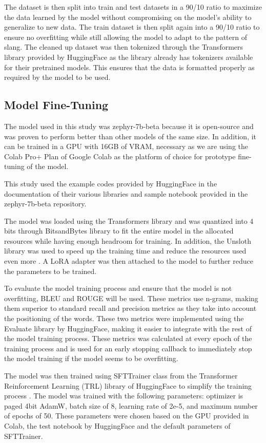 The dataset is then split into train and test datasets in a 90/10 ratio to maximize the data learned by the model without compromising on the model's ability to generalize to new data. The train dataset is then split again into a 90/10 ratio to ensure no overfitting while still allowing the model to adapt to the pattern of slang. The cleaned up dataset was then tokenized through the Transformers library provided by HuggingFace as the library already has tokenizers available for their pretrained models.
This ensures that the data is formatted properly as required by the model to be used.

\subsection{Model Fine-Tuning}
The model used in this study was zephyr-7b-beta because it is open-source and was proven to perform better than other models of the same size. In addition, it can be trained in a GPU with 16GB of VRAM, necessary as we are using the Colab Pro+ Plan of Google Colab as the platform of choice for prototype fine-tuning of the model.

This study used the example codes provided by HuggingFace in the documentation of their various libraries and sample notebook provided in the zephyr-7b-beta repository. 

The model was loaded using the Transformers library and was quantized into 4 bits through BitsandBytes library to fit the entire model in the allocated resources while having enough headroom for training. In addition, the Unsloth library was used to speed up the training time and reduce the resources used even more \cite{unsloth}. A LoRA adapter was then attached to the model to further reduce the parameters to be trained.

To evaluate the model training process and ensure that the model is not overfitting, BLEU and ROUGE will be used. These metrics use n-grams, making them superior to standard recall and precision metrics as they take into account the positioning of the words. These two metrics were implemented using the Evaluate library by HuggingFace, making it easier to integrate with the rest of the model training process. These metrics was calculated at every epoch of the training process and is used for an early stopping callback to immediately stop the model training if the model seems to be overfitting.

The model was then trained using SFTTrainer class from the Transformer Reinforcement Learning (TRL) library of HuggingFace to simplify the training process \cite{vonwerra2022trl}. The model was trained with the following parameters: optimizer is paged 4bit AdamW, batch size of 8, learning rate of 2e-5, and maximum number of epochs of 50. These parameters were chosen based on the GPU provided in Colab, the test notebook by HuggingFace and the default parameters of SFTTrainer.

